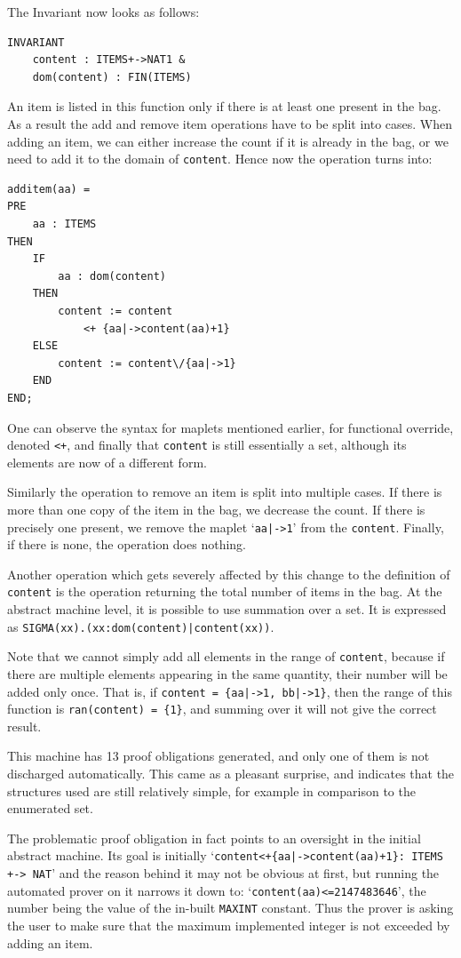 \documentclass[12pt,journal,duplex]{IEEEtran}
\begin{document}
	The Invariant now looks as follows:
	\begin{lstlisting}
INVARIANT
	content : ITEMS+->NAT1 &
	dom(content) : FIN(ITEMS)
	\end{lstlisting}

	An item is listed in this function only if there is at least one present in the bag. As a result the add and remove item operations have to be split into cases. When adding an item, we can either increase the count if it is already in the bag, or we need to add it to the domain of \texttt{content}. Hence now the operation turns into:
	\begin{lstlisting}
additem(aa) =
PRE
	aa : ITEMS
THEN
	IF
		aa : dom(content)
	THEN
		content := content
			<+ {aa|->content(aa)+1}
	ELSE
		content := content\/{aa|->1}
	END
END;
	\end{lstlisting}
	One can observe the syntax for maplets mentioned earlier, for functional override, denoted \texttt{<+}, and finally that \texttt{content} is still essentially a set, although its elements are now of a different form.

	Similarly the operation to remove an item is split into multiple cases. If there is more than one copy of the item in the bag, we decrease the count. If there is precisely one present, we remove the maplet `\texttt{aa|->1}' from the \texttt{content}. Finally, if there is none, the operation does nothing.

	Another operation which gets severely affected by this change to the definition of \texttt{content} is the operation returning the total number of items in the bag. At the abstract machine level, it is possible to use summation over a set. It is expressed as \verb=SIGMA(xx).(xx:dom(content)|content(xx))=.

	Note that we cannot simply add all elements in the range of \texttt{content}, because if there are multiple elements appearing in the same quantity, their number will be added only once. That is, if \texttt{content = \{aa|->1, bb|->1\}}, then the range of this function is \texttt{ran(content) = \{1\}}, and summing over it will not give the correct result.

	This machine has 13 proof obligations generated, and only one of them is not discharged automatically. This came as a pleasant surprise, and indicates that the structures used are still relatively simple, for example in comparison to the enumerated set.

	The problematic proof obligation in fact points to an oversight in the initial abstract machine. Its goal is initially `\texttt{content<+\{aa|->content(aa)+1\}: ITEMS +-> NAT}' and the reason behind it may not be obvious at first, but running the automated prover on it narrows it down to: `\texttt{content(aa)<=2147483646}', the number being the value of the in-built \texttt{MAXINT} constant. Thus the prover is asking the user to make sure that the maximum implemented integer is not exceeded by adding an item.
\end{document}
